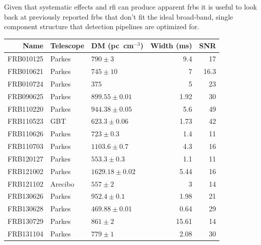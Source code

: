 \documentclass[a4paper,fleqn,usenatbib]{mnras}
\begin{document}
Given that systematic effects and \gls{rfi} can produce apparent \glspl{frb} it
is useful to look back at previously reported \glspl{frb} that don't fit the
ideal broad-band, single component structure that detection pipelines are
optimized for.


\begin{table}
\centering
\begin{tabular}{ r l l r r }
Name      & Telescope & DM (pc~cm$^{-3}$)& Width (ms) & SNR  \\
\hline
FRB010125 & Parkes  & $790 \pm 3$        &  9.4 	&	17   \\ 
FRB010621 & Parkes  & $745 \pm 10$       &  7		&	16.3 \\
FRB010724 & Parkes  & $375$              &  5		&	23   \\ 
FRB090625 & Parkes  & $899.55 \pm 0.01$  &  1.92	&	30   \\ 
FRB110220 & Parkes  & $944.38 \pm 0.05$  &  5.6		&	49   \\ 
FRB110523 & GBT     & $623.3 \pm 0.06$   &  1.73	&	42   \\ 
FRB110626 & Parkes  & $723 \pm 0.3$      &  1.4		&	11   \\ 
FRB110703 & Parkes  & $1103.6 \pm 0.7$   &  4.3		&	16   \\ 
FRB120127 & Parkes  & $553.3 \pm 0.3$    &  1.1		&	11   \\ 
FRB121002 & Parkes  & $1629.18 \pm 0.02$ &  5.44	&	16   \\ 
FRB121102 & Arecibo & $557 \pm 2$        &  3		&	14   \\ 
FRB130626 & Parkes  & $952.4 \pm 0.1$    &  1.98	&	21   \\ 
FRB130628 & Parkes  & $469.88 \pm 0.01$  &  0.64	&	29   \\ 
FRB130729 & Parkes  & $861 \pm 2$        &  15.61	&	14   \\ 
FRB131104 & Parkes  & $779 \pm 1$        &  2.08	&	30   \\ 

\end{tabular}
\end{table}
\end{document}
